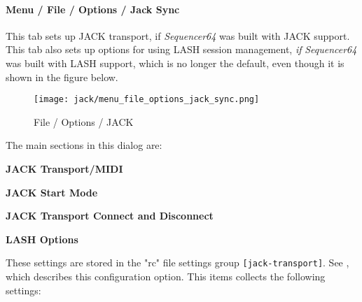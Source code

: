 \paragraph{Menu / File / Options / Jack Sync}
\label{paragraph:seq64_menu_file_options_jack_sync}

   This tab sets up JACK transport, if \textsl{Sequencer64}
   was built with JACK support.
   This tab also sets up options for using LASH session management, \textsl{if}
   \textsl{Sequencer64} was built with LASH support, which is no longer the
   default, even though it is shown in the figure below.

\begin{figure}[H]
   \centering 
   \texttt{[image: jack/menu\_file\_options\_jack\_sync.png]}
   \caption{File / Options / JACK}
   \label{fig:seq64_menu_file_options_jack_sync}
\end{figure}

   The main sections in this dialog are:

   \begin{enumber}
      \item \textbf{JACK Transport/MIDI}
      \item \textbf{JACK Start Mode}
      \item \textbf{JACK Transport Connect and Disconnect}
      \item \textbf{LASH Options}
   \end{enumber}

   \setcounter{ItemCounter}{0}      %

   These settings are stored in the "rc" file settings group
   \texttt{[jack-transport]}.
   See ,
   which describes this configuration option.
   This items collects the following settings:

